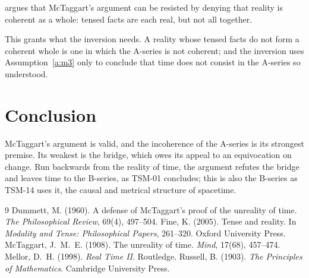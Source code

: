 \documentclass{situationist-preprint}
\begin{document}
\begin{objection}[Fragmentalism]
\citet{Fine2005} argues that McTaggart's argument can be resisted by denying that reality is coherent as a whole: tensed facts are each real, but not all together.
\end{objection}

\begin{reply}
This grants what the inversion needs. A reality whose tensed facts do not form a coherent whole is one in which the A-series is not coherent; and the inversion uses Assumption~\ref{a:m3} only to conclude that time does not consist in the A-series so understood.
\end{reply}

\section{Conclusion}

McTaggart's argument is valid, and the incoherence of the A-series is its strongest premise. Its weakest is the bridge, which owes its appeal to an equivocation on change. Run backwards from the reality of time, the argument refutes the bridge and leaves time to the B-series, as TSM-01 concludes; this is also the B-series as TSM-14 uses it, the causal and metrical structure of spacetime.

\begin{thebibliography}{9}
 Dummett, M. (1960). A defense of McTaggart's proof of the unreality of time. \emph{The Philosophical Review}, 69(4), 497--504.
 Fine, K. (2005). Tense and reality. In \emph{Modality and Tense: Philosophical Papers}, 261--320. Oxford University Press.
 McTaggart, J.~M.~E. (1908). The unreality of time. \emph{Mind}, 17(68), 457--474.
 Mellor, D.~H. (1998). \emph{Real Time II}. Routledge.
 Russell, B. (1903). \emph{The Principles of Mathematics}. Cambridge University Press.
\end{thebibliography}
\end{document}

